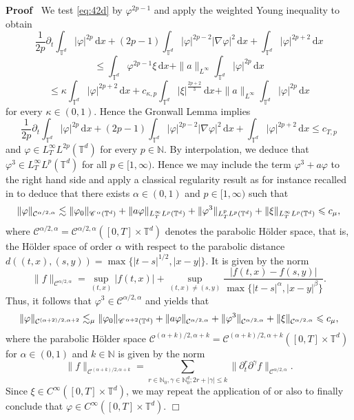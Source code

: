 \documentclass[a4paper,11pt]{article}
\newenvironment{proof}{\noindent\textbf{Proof\ }}{\hspace*{\fill}$\Box$\medskip}
\numberwithin{equation}{section}
\newcommand{\CC}{\mathscr{C} \hspace{.1em}}
\newcommand{\N}{\mathbb{N}}
\newcommand{\8}{\infty}
\newcommand{\dd}{\mathrm{d}}
\begin{document}
\begin{proof}
We test \eqref{eq:42d} by $\varphi^{2p-1}$ and apply the weighted Young inequality  to obtain
$$
\frac{1}{2p}\partial_{t}\int_{\mathbb{T}^{d}} |\varphi|^{2p}\,\dd x+(2p-1)\int_{\mathbb{T}^{d}} |\varphi|^{2p-2}|\nabla\varphi|^2\,\dd x+\int_{\mathbb{T}^{d}} |\varphi|^{2p+2}\,\dd x
$$
$$
\leqslant \int_{\mathbb{T}^{d}} \varphi^{2p-1}\xi\,\dd x+\|a\|_{L^{\8}}\int_{\mathbb{T}^{d}} |\varphi|^{2p}\,\dd x
$$
$$
\leqslant \kappa \int_{\mathbb{T}^{d}}|\varphi |^{2p+2}\,\dd x+c_{\kappa,p}\int_{\mathbb{T}^{d}}|\xi|^{\frac{2p+2}{3}}\,\dd x+\|a\|_{L^{\8}}\int_{\mathbb{T}^{d}} |\varphi|^{2p}\,\dd x
$$
for every $\kappa\in (0,1)$. Hence the Gronwall Lemma implies
$$
\frac{1}{2p}\partial_{t}\int_{\mathbb{T}^{d}} |\varphi|^{2p}\,\dd x+(2p-1)\int_{\mathbb{T}^{d}} |\varphi|^{2p-2}|\nabla\varphi|^2\,\dd x+\int_{\mathbb{T}^{d}} |\varphi|^{2p+2}\,\dd x\leqslant c_{T,p}
$$
and $\varphi\in L^{\infty}_{T}L^{2p}(\mathbb{T}^{d})$ for every $p\in\N$.
By interpolation, we deduce that $\varphi^3\in L^{\infty}_{T}L^{p}(\mathbb{T}^{d})$ for all $p\in [1,\infty)$. Hence we may include the  term $\varphi^{3}+a\varphi$ to the right hand side and apply a classical regularity result as for instance recalled in \cite[Theorem 3.1]{DDMH} to deduce that there exists $\alpha\in (0,1)$ and $p\in[1,\infty)$ such that
$$
\|\varphi\|_{\mathcal{C}^{\alpha/2,\alpha}}\lesssim \|\varphi_{0}\|_{\CC^{\alpha}(\mathbb{T}^{d})}+\|a\varphi\|_{L^{\infty}_{T}L^{p}(\mathbb{T}^{d})} + \|\varphi^3\|_{L^{p}_{T}L^{p}(\mathbb{T}^{d})} +  \|\xi\|_{L^{\infty}_{T}L^{p}(\mathbb{T}^{d})}\leqslant c_{\mu},
$$
where $\mathcal{C}^{\alpha/2,\alpha}=\mathcal{C}^{\alpha/2,\alpha}([0,T]\times \mathbb{T}^{d})$ denotes the parabolic H\"older space, that is, the H\"older space of order $\alpha$ with respect  to the parabolic distance $d((t,x),(s,y))=\max\{|t-s|^{1/2},|x-y|\}$. It is given by the norm
$$
\|f\|_{\mathcal{C}^{\alpha/2,\alpha}}=\sup_{(t,x)}|f(t,x)|+\sup_{(t,x)\neq(s,y)}\frac{|f(t,x)-f(s,y)|}{\max\{|t-s|^{\alpha},|x-y|^{\beta}\}}.
$$
Thus, it follows that $\varphi^{3}\in  \mathcal{C}^{\alpha/2,\alpha}$ and \cite[Theorem 3.4]{DDMH} yields that
$$
\|\varphi\|_{\mathcal{C}^{(\alpha+2)/2,\alpha+2}}\lesssim_{\mu} \|\varphi_{0}\|_{\CC^{\alpha+2}(\mathbb{T}^{d})}+\|a\varphi\|_{\mathcal{C}^{\alpha/2,\alpha}}+ \|\varphi^3\|_{\mathcal{C}^{\alpha/2,\alpha}} +  \|\xi\|_{\mathcal{C}^{\alpha/2,\alpha}}\leqslant c_{\mu},
$$
where the parabolic H\"older space  $\mathcal{C}^{(\alpha+k)/2,\alpha+k}=\mathcal{C}^{(\alpha+k)/2,\alpha+k}([0,T]\times \mathbb{T}^{d})$ for $\alpha\in (0,1)$ and $k\in\N$ is given by the norm
$$
\|f\|_{\mathcal{C}^{(\alpha+k)/2,\alpha+k}}=\sum_{r\in\N_{0},\gamma\in \N_{0}^{d};2r+|\gamma|\leqslant k}\|\partial^{r}_{t}\partial^{\gamma}f\|_{\mathcal{C}^{\alpha/2,\alpha}}.
$$
Since $\xi\in C^{\infty}([0,T]\times \mathbb{T}^{d})$, we may repeat the application of  \cite[Theorem 3.4]{DDMH} or also \cite[Chapter IV, Theorem 5.2]{LSU} to finally conclude that $\varphi\in C^{\infty}([0,T]\times \mathbb{T}^{d}).$
\end{proof}
\end{document}
